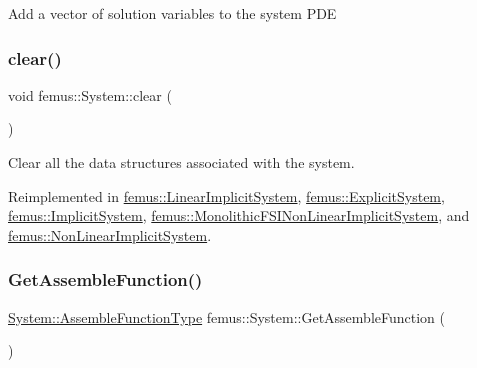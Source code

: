 Add a vector of solution variables to the system P\+DE \mbox{\label{classfemus_1_1_system_ad1a19dbff3cea3d496cdb530ea2bca19}} 
\subsubsection{\texorpdfstring{clear()}{clear()}}
{\footnotesize\ttfamily void femus\+::\+System\+::clear (\begin{DoxyParamCaption}{ }\end{DoxyParamCaption})\hspace{0.3cm}{\ttfamily [virtual]}}

Clear all the data structures associated with the system. 

Reimplemented in \mbox{\hyperlink{classfemus_1_1_linear_implicit_system_ace039665432e53db0c25b0efede44a76}{femus\+::\+Linear\+Implicit\+System}}, \mbox{\hyperlink{classfemus_1_1_explicit_system_ac078fbc3f758429e8a60dac487aab5ce}{femus\+::\+Explicit\+System}}, \mbox{\hyperlink{classfemus_1_1_implicit_system_a0d5395e6a8de6625f9059384b990f83f}{femus\+::\+Implicit\+System}}, \mbox{\hyperlink{classfemus_1_1_monolithic_f_s_i_non_linear_implicit_system_ac7f2bedf4d1c6b00f5443cb5128a3069}{femus\+::\+Monolithic\+F\+S\+I\+Non\+Linear\+Implicit\+System}}, and \mbox{\hyperlink{classfemus_1_1_non_linear_implicit_system_afc52f569e5be8c3bf593a00c883d7192}{femus\+::\+Non\+Linear\+Implicit\+System}}.

\mbox{\label{classfemus_1_1_system_a6ea05a107d1946ab9685aae7d228afb6}} 
\subsubsection{\texorpdfstring{Get\+Assemble\+Function()}{GetAssembleFunction()}}
{\footnotesize\ttfamily \mbox{\hyperlink{classfemus_1_1_system_ae71fa78abbc4b3efe8ef1dc057275b9b}{System\+::\+Assemble\+Function\+Type}} femus\+::\+System\+::\+Get\+Assemble\+Function (\begin{DoxyParamCaption}{ }\end{DoxyParamCaption})}

\mbox{\label{classfemus_1_1_system_a7d62291adc624e55f78ca2d1c32c6971}} 
